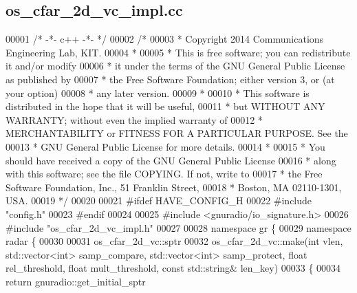 \subsection{os\+\_\+cfar\+\_\+2d\+\_\+vc\+\_\+impl.\+cc}
\label{os__cfar__2d__vc__impl_8cc_source}

\begin{DoxyCode}
00001 \textcolor{comment}{/* -*- c++ -*- */}
00002 \textcolor{comment}{/* }
00003 \textcolor{comment}{ * Copyright 2014 Communications Engineering Lab, KIT.}
00004 \textcolor{comment}{ * }
00005 \textcolor{comment}{ * This is free software; you can redistribute it and/or modify}
00006 \textcolor{comment}{ * it under the terms of the GNU General Public License as published by}
00007 \textcolor{comment}{ * the Free Software Foundation; either version 3, or (at your option)}
00008 \textcolor{comment}{ * any later version.}
00009 \textcolor{comment}{ * }
00010 \textcolor{comment}{ * This software is distributed in the hope that it will be useful,}
00011 \textcolor{comment}{ * but WITHOUT ANY WARRANTY; without even the implied warranty of}
00012 \textcolor{comment}{ * MERCHANTABILITY or FITNESS FOR A PARTICULAR PURPOSE.  See the}
00013 \textcolor{comment}{ * GNU General Public License for more details.}
00014 \textcolor{comment}{ * }
00015 \textcolor{comment}{ * You should have received a copy of the GNU General Public License}
00016 \textcolor{comment}{ * along with this software; see the file COPYING.  If not, write to}
00017 \textcolor{comment}{ * the Free Software Foundation, Inc., 51 Franklin Street,}
00018 \textcolor{comment}{ * Boston, MA 02110-1301, USA.}
00019 \textcolor{comment}{ */}
00020 
00021 \textcolor{preprocessor}{#ifdef HAVE\_CONFIG\_H}
00022 \textcolor{preprocessor}{#include "config.h"}
00023 \textcolor{preprocessor}{#endif}
00024 
00025 \textcolor{preprocessor}{#include <gnuradio/io\_signature.h>}
00026 \textcolor{preprocessor}{#include "os_cfar_2d_vc_impl.h"}
00027 
00028 \textcolor{keyword}{namespace }gr \{
00029   \textcolor{keyword}{namespace }radar \{
00030 
00031     os_cfar_2d_vc::sptr
00032     os_cfar_2d_vc::make(\textcolor{keywordtype}{int} vlen, std::vector<int> samp\_compare, std::vector<int> samp\_protect, \textcolor{keywordtype}{float} 
      rel\_threshold, \textcolor{keywordtype}{float} mult\_threshold, \textcolor{keyword}{const} std::string& len\_key)
00033     \{
00034       \textcolor{keywordflow}{return} gnuradio::get\_initial\_sptr

\end{DoxyCode}
